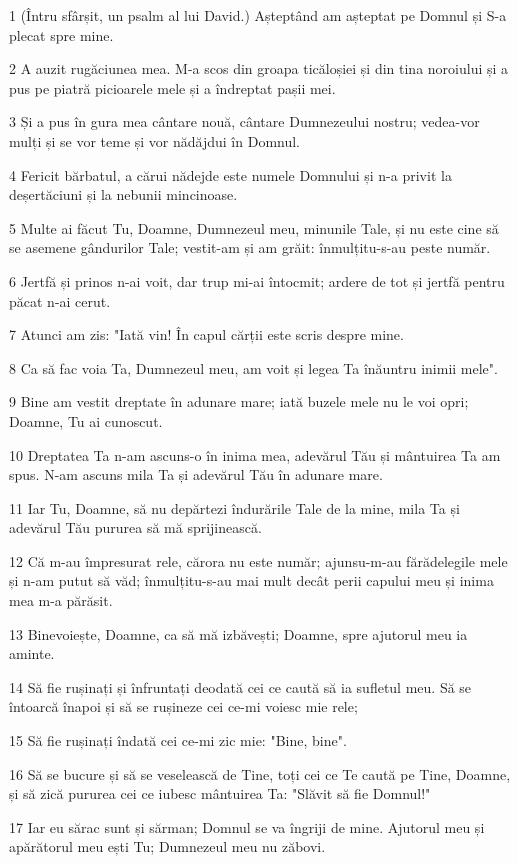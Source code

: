 \par 1 (Întru sfârșit, un psalm al lui David.) Așteptând am așteptat pe Domnul și S-a plecat spre mine.
\par 2 A auzit rugăciunea mea. M-a scos din groapa ticăloșiei și din tina noroiului și a pus pe piatră picioarele mele și a îndreptat pașii mei.
\par 3 Și a pus în gura mea cântare nouă, cântare Dumnezeului nostru; vedea-vor mulți și se vor teme și vor nădăjdui în Domnul.
\par 4 Fericit bărbatul, a cărui nădejde este numele Domnului și n-a privit la deșertăciuni și la nebunii mincinoase.
\par 5 Multe ai făcut Tu, Doamne, Dumnezeul meu, minunile Tale, și nu este cine să se asemene gândurilor Tale; vestit-am și am grăit: înmulțitu-s-au peste număr.
\par 6 Jertfă și prinos n-ai voit, dar trup mi-ai întocmit; ardere de tot și jertfă pentru păcat n-ai cerut.
\par 7 Atunci am zis: "Iată vin! În capul cărții este scris despre mine.
\par 8 Ca să fac voia Ta, Dumnezeul meu, am voit și legea Ta înăuntru inimii mele".
\par 9 Bine am vestit dreptate în adunare mare; iată buzele mele nu le voi opri; Doamne, Tu ai cunoscut.
\par 10 Dreptatea Ta n-am ascuns-o în inima mea, adevărul Tău și mântuirea Ta am spus. N-am ascuns mila Ta și adevărul Tău în adunare mare.
\par 11 Iar Tu, Doamne, să nu depărtezi îndurările Tale de la mine, mila Ta și adevărul Tău pururea să mă sprijinească.
\par 12 Că m-au împresurat rele, cărora nu este număr; ajunsu-m-au fărădelegile mele și n-am putut să văd; înmulțitu-s-au mai mult decât perii capului meu și inima mea m-a părăsit.
\par 13 Binevoiește, Doamne, ca să mă izbăvești; Doamne, spre ajutorul meu ia aminte.
\par 14 Să fie rușinați și înfruntați deodată cei ce caută să ia sufletul meu. Să se întoarcă înapoi și să se rușineze cei ce-mi voiesc mie rele;
\par 15 Să fie rușinați îndată cei ce-mi zic mie: "Bine, bine".
\par 16 Să se bucure și să se veselească de Tine, toți cei ce Te caută pe Tine, Doamne, și să zică pururea cei ce iubesc mântuirea Ta: "Slăvit să fie Domnul!"
\par 17 Iar eu sărac sunt și sărman; Domnul se va îngriji de mine. Ajutorul meu și apărătorul meu ești Tu; Dumnezeul meu nu zăbovi.

